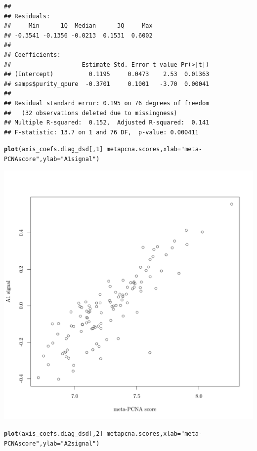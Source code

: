 \documentclass{article}\usepackage[]{graphicx}\usepackage[]{color}
\makeatletter
\def\maxwidth{ %
  \ifdim\Gin@nat@width>\linewidth
    \linewidth
  \else
    \Gin@nat@width
  \fi
}
\newcommand{\hlnum}[1]{\textcolor[rgb]{0.686,0.059,0.569}{#1}}%
\newcommand{\hlstr}[1]{\textcolor[rgb]{0.192,0.494,0.8}{#1}}%
\newcommand{\hlopt}[1]{\textcolor[rgb]{0,0,0}{#1}}%
\newcommand{\hlstd}[1]{\textcolor[rgb]{0.345,0.345,0.345}{#1}}%
\newcommand{\hlkwc}[1]{\textcolor[rgb]{0.333,0.667,0.333}{#1}}%
\newcommand{\hlkwd}[1]{\textcolor[rgb]{0.737,0.353,0.396}{\textbf{#1}}}%
\newenvironment{kframe}{%
 \def\at@end@of@kframe{}%
 \ifinner\ifhmode%
  \def\at@end@of@kframe{\end{minipage}}%
  \begin{minipage}{\columnwidth}%
 \fi\fi%
 \def\FrameCommand##1{\hskip\@totalleftmargin \hskip-\fboxsep
 \colorbox{shadecolor}{##1}\hskip-\fboxsep
     \hskip-\linewidth \hskip-\@totalleftmargin \hskip\columnwidth}%
 \MakeFramed {\advance\hsize-\width
   \@totalleftmargin\z@ \linewidth\hsize
   \@setminipage}}%
 {\par\unskip\endMakeFramed%
 \at@end@of@kframe}
\newenvironment{knitrout}{}{} %
\makeatother
\begin{document}
\begin{knitrout}
\begin{kframe}
\begin{verbatim}
## 
## Residuals:
##     Min      1Q  Median      3Q     Max 
## -0.3541 -0.1356 -0.0213  0.1531  0.6002 
## 
## Coefficients:
##                    Estimate Std. Error t value Pr(>|t|)
## (Intercept)          0.1195     0.0473    2.53  0.01363
## samps$purity_qpure  -0.3701     0.1001   -3.70  0.00041
## 
## Residual standard error: 0.195 on 76 degrees of freedom
##   (32 observations deleted due to missingness)
## Multiple R-squared:  0.152,	Adjusted R-squared:  0.141 
## F-statistic: 13.7 on 1 and 76 DF,  p-value: 0.000411
\end{verbatim}
\begin{alltt}
\hlkwd{plot}\hlstd{(axis_coefs.diag_dsd[,}\hlnum{1}\hlstd{]} \hlopt{~} \hlstd{metapcna.scores,} \hlkwc{xlab} \hlstd{=} \hlstr{"meta-PCNA score"}\hlstd{,} \hlkwc{ylab} \hlstd{=} \hlstr{"A1 signal"}\hlstd{)}
\end{alltt}
\end{kframe}

{\centering \includegraphics[width=\maxwidth]{figure/nmf-msigdb-cor-plots-5} 

}


\begin{kframe}\begin{alltt}
\hlkwd{plot}\hlstd{(axis_coefs.diag_dsd[,}\hlnum{2}\hlstd{]} \hlopt{~} \hlstd{metapcna.scores,} \hlkwc{xlab} \hlstd{=} \hlstr{"meta-PCNA score"}\hlstd{,} \hlkwc{ylab} \hlstd{=} \hlstr{"A2 signal"}\hlstd{)}
\end{alltt}
\end{kframe}


\end{knitrout}
\end{document}
